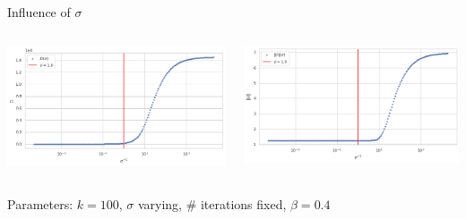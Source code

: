 \documentclass{beamer}
\begin{document}
\begin{frame}{Influence of $\sigma$}
	\begin{minipage}[0.95\textheight]{\textwidth}
	\begin{columns}[T]
	\begin{column}{0.50\textwidth}
	\includegraphics[width=\textwidth, keepaspectratio]{../images/D_sigma.png}
	\end{column}
	\begin{column}{0.50\textwidth}
	\includegraphics[width=\textwidth, keepaspectratio]{../images/v_sigma.png}
	\end{column}
	\end{columns}
	\end{minipage}
	\begin{center}
		Parameters: $k=100$, $\sigma$ varying, \# iterations fixed, $\beta=0.4$
	\end{center}
\end{frame}
\end{document}
